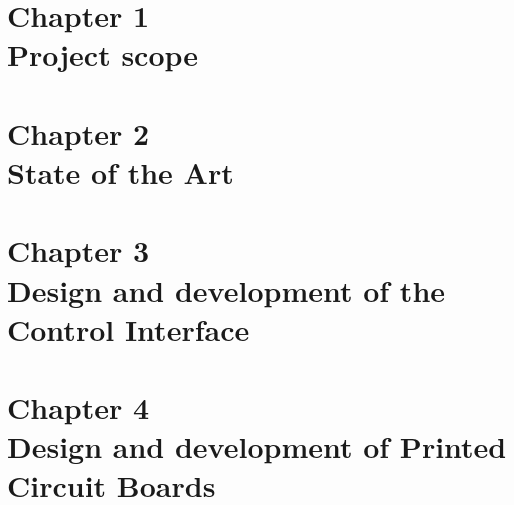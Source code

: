 \documentclass[a4paper,12pt,oneside]{report}
\begin{document}





\tableofcontents
\listoffigures
\listoftables




\pagestyle{fancy}

\newpage
{}



\part*{Chapter 1 \\Project scope}

\part*{Chapter 2 \\State of the Art}

\part*{Chapter 3 \\Design and development of the Control Interface}

\part*{Chapter 4 \\Design and development of Printed Circuit Boards}

% 

\fancyhead[R]{}





\newpage

\end{document}

